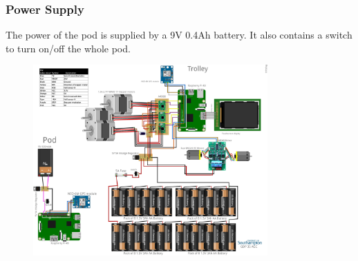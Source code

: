 \documentclass[11pt,landscape]{article}
\begin{document}
\begin{multicols}{3}
\subsubsection{Power Supply}
The power of the pod is supplied by a 9V 0.4Ah battery. It also contains a
switch to turn on/off the whole pod.

\end{multicols}

\begin{figure}
    \begin{center}
    \includegraphics[width=0.8\textwidth]{electrical_schematic.png}
    \label{fig:electrical_schematic}
    \end{center}
\end{figure}
\end{document}
